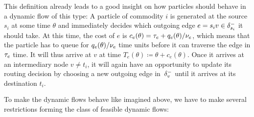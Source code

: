 This definition already leads to a good insight on how particles should behave in a dynamic flow of this type:
A particle of commodity $i$ is generated at the source $s_i$ at some time $\theta$ and immediately decides which outgoing edge $e=s_i v\in \delta^-_{s_i}$ it should take.
At this time, the cost of $e$ is $c_e(\theta) = \tau_e + q_e(\theta) / \nu_e$, which means that the particle has to queue for $q_e(\theta) / \nu_e$ time units before it can traverse the edge in $\tau_e$ time.
It will thus arrive at $v$ at time $T_e(\theta) \coloneqq \theta + c_e(\theta)$.
Once it arrives at an intermediary node $v\neq t_i$, it will again have an opportunity to update its routing decision by choosing a new outgoing edge in~$\delta^-_{v}$ until it arrives at its destination $t_i$. 

To make the dynamic flows behave like imagined above, we have to make several restrictions forming the class of feasible dynamic flows:


